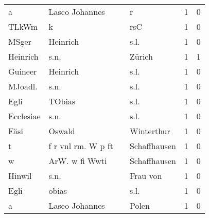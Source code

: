 \begin{tabular}{llllrr}
                        a &                     Lasco Johannes &             &                                           r &          1 &         0 \\
                    TLkWm &                                  k &             &                                         rsC &          1 &         0 \\
                    MSger &                           Heinrich &             &                                        s.l. &          1 &         0 \\
                 Heinrich &                               s.n. &             &                                      Zürich &          1 &         1 \\
                  Guineer &                           Heinrich &             &                                        s.l. &          1 &         0 \\
                  MJoadl. &                               s.n. &             &                                        s.l. &          1 &         0 \\
                     Egli &                             TObias &             &                                        s.l. &          1 &         0 \\
                Ecclesiae &                               s.n. &             &                                        s.l. &          1 &         0 \\
                     Fäsi &                             Oswald &             &                                  Winterthur &          1 &         0 \\
                        t &                 f r vnl rm. W p ft &             &                                Schaffhausen &          1 &         0 \\
                        w &                     ArW. w fi Wwti &             &                                Schaffhausen &          1 &         0 \\
                   Hinwil &                               s.n. &             &                                    Frau von &          1 &         0 \\
                     Egli &                              obias &             &                                        s.l. &          1 &         0 \\
                        a &                     Laseo Johannes &             &                                       Polen &          1 &         0 \\

\end{tabular}
